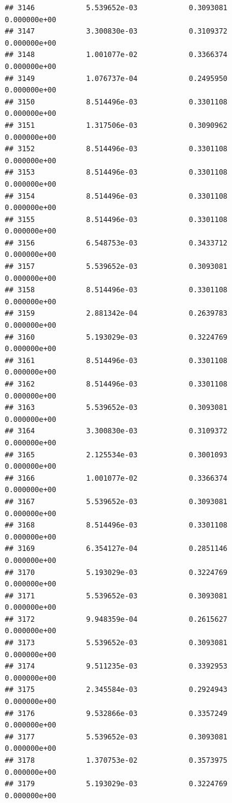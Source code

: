 \documentclass[
]{article}
\begin{document}
\begin{verbatim}
## 3146            5.539652e-03            0.3093081            0.000000e+00
## 3147            3.300830e-03            0.3109372            0.000000e+00
## 3148            1.001077e-02            0.3366374            0.000000e+00
## 3149            1.076737e-04            0.2495950            0.000000e+00
## 3150            8.514496e-03            0.3301108            0.000000e+00
## 3151            1.317506e-03            0.3090962            0.000000e+00
## 3152            8.514496e-03            0.3301108            0.000000e+00
## 3153            8.514496e-03            0.3301108            0.000000e+00
## 3154            8.514496e-03            0.3301108            0.000000e+00
## 3155            8.514496e-03            0.3301108            0.000000e+00
## 3156            6.548753e-03            0.3433712            0.000000e+00
## 3157            5.539652e-03            0.3093081            0.000000e+00
## 3158            8.514496e-03            0.3301108            0.000000e+00
## 3159            2.881342e-04            0.2639783            0.000000e+00
## 3160            5.193029e-03            0.3224769            0.000000e+00
## 3161            8.514496e-03            0.3301108            0.000000e+00
## 3162            8.514496e-03            0.3301108            0.000000e+00
## 3163            5.539652e-03            0.3093081            0.000000e+00
## 3164            3.300830e-03            0.3109372            0.000000e+00
## 3165            2.125534e-03            0.3001093            0.000000e+00
## 3166            1.001077e-02            0.3366374            0.000000e+00
## 3167            5.539652e-03            0.3093081            0.000000e+00
## 3168            8.514496e-03            0.3301108            0.000000e+00
## 3169            6.354127e-04            0.2851146            0.000000e+00
## 3170            5.193029e-03            0.3224769            0.000000e+00
## 3171            5.539652e-03            0.3093081            0.000000e+00
## 3172            9.948359e-04            0.2615627            0.000000e+00
## 3173            5.539652e-03            0.3093081            0.000000e+00
## 3174            9.511235e-03            0.3392953            0.000000e+00
## 3175            2.345584e-03            0.2924943            0.000000e+00
## 3176            9.532866e-03            0.3357249            0.000000e+00
## 3177            5.539652e-03            0.3093081            0.000000e+00
## 3178            1.370753e-02            0.3573975            0.000000e+00
## 3179            5.193029e-03            0.3224769            0.000000e+00

\end{verbatim}
\end{document}
